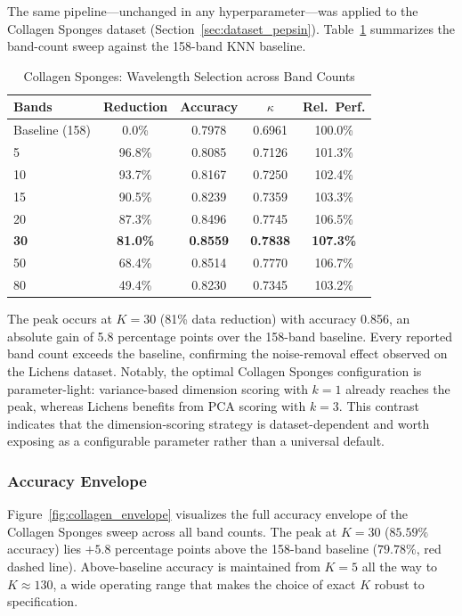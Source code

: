 The same pipeline---unchanged in any hyperparameter---was applied to the Collagen Sponges dataset (Section~\ref{sec:dataset_pepsin}).
Table~\ref{tab:pepsin_results} summarizes the band-count sweep against the 158-band KNN baseline.

\begin{table}[!t]
\centering
\caption{Collagen Sponges: Wavelength Selection across Band Counts}
\label{tab:pepsin_results}
\begin{tabular}{@{}lcccc@{}}
\toprule
\textbf{Bands} & \textbf{Reduction} & \textbf{Accuracy} & \textbf{$\kappa$} & \textbf{Rel.\ Perf.} \\
\midrule
Baseline (158) & 0.0\% & 0.7978 & 0.6961 & 100.0\% \\
\midrule
5 & 96.8\% & 0.8085 & 0.7126 & 101.3\% \\
10 & 93.7\% & 0.8167 & 0.7250 & 102.4\% \\
15 & 90.5\% & 0.8239 & 0.7359 & 103.3\% \\
20 & 87.3\% & 0.8496 & 0.7745 & 106.5\% \\
\textbf{30} & \textbf{81.0\%} & \textbf{0.8559} & \textbf{0.7838} & \textbf{107.3\%} \\
50 & 68.4\% & 0.8514 & 0.7770 & 106.7\% \\
80 & 49.4\% & 0.8230 & 0.7345 & 103.2\% \\
\bottomrule
\end{tabular}
\end{table}

The peak occurs at $K=30$ (81\% data reduction) with accuracy 0.856, an absolute gain of 5.8 percentage points over the 158-band baseline.
Every reported band count exceeds the baseline, confirming the noise-removal effect observed on the Lichens dataset.
Notably, the optimal Collagen Sponges configuration is parameter-light: variance-based dimension scoring with $k=1$ already reaches the peak, whereas Lichens benefits from PCA scoring with $k=3$.
This contrast indicates that the dimension-scoring strategy is dataset-dependent and worth exposing as a configurable parameter rather than a universal default.

\subsubsection{Accuracy Envelope}
Figure~\ref{fig:collagen_envelope} visualizes the full accuracy envelope of the Collagen Sponges sweep across all band counts.
The peak at $K=30$ ($85.59\%$ accuracy) lies $+5.8$ percentage points above the 158-band baseline ($79.78\%$, red dashed line).
Above-baseline accuracy is maintained from $K=5$ all the way to $K\approx 130$, a wide operating range that makes the choice of exact $K$ robust to specification.

